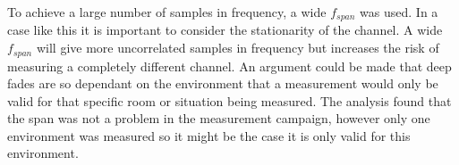 To achieve a large number of samples in frequency, a wide $f_{span}$ was used. In a case like this it is important to consider the stationarity of the channel. A wide $f_{span}$ will give more uncorrelated samples in frequency but increases the risk of measuring a completely different channel. An argument could be made that deep fades are so dependant on the environment that a measurement would only be valid for that specific room or situation being measured. The analysis found that the span was not a problem in the measurement campaign, however only one environment was measured so it might be the case it is only valid for this environment.

